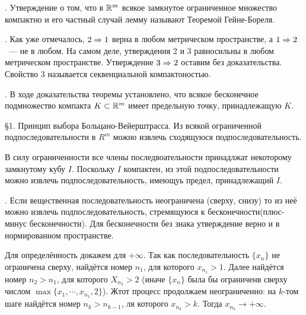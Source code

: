 . Утверждение о том, что в $\mathbb{R}^m$ всякое замкнутое ограниченное множество компактно и его частный случай лемму называют \q Теоремой Гейне-Бореля.

. Как уже отмечалось, $2 \Rightarrow 1$ верна в любом метрическом пространстве, а $1 \Rightarrow 2$~--- не в любом. На самом деле, утверждения 2 и 3 равносильны в любом метрическом пространстве. Утверждение $3\Rightarrow 2$ оставим без доказательства. Свойство 3 называется секвенциальной компактоностью.

. В ходе доказательства теоремы установлено, что всякое бесконечное подмножество компакта $K \subset \mathbb{R}^m$ имеет предельную точку, принадлежащую $K$.

\S1. \q Принцип выбора Больцано-Вейерштрасса. Из всякой ограниченной подпоследовательности в $R^m$ можно извлечь сходящуюся подпоследовательность.

\D В силу ограниченности все члены последвоательности принадлжат некоторому замкнутому кубу $I$. Поскольку $I$ компактен, из этой подпоследовательности можно извлечь подпоследовательность, имеющуь предел, принадлежащий $I$.

. Если вещественная последовательность неограничена (сверху, снизу) то из неё можно извлечь подпоследовательность, стремящуюся к бесконечности(плюс-минус бесконечности). Для бесконечности без знака утверждение верно и в нормированном пространстве.

\D Для определённость докажем для $+\infty$. Так как последовательность $\{x_n\}$ не ограничена сверху, найдётся номер $n_1$, для которого $x_{n_1} > 1$. Далее найдётся номер $n_2 > n_1$, для которого $X_{n_2} > 2$ (иначе $\{x_n\}$ была бы ограниченв сверху числом $\max\{x_1, \cdots,x_{n_1}, 2\}$). Жтот процесс продолжаем неограниченно: на $k$-том шаге найдётся номер $n_k > n_{k - 1}$, ля которого $x_{n_k} > k$. Тогда $x_{n_k} \to +\infty$.